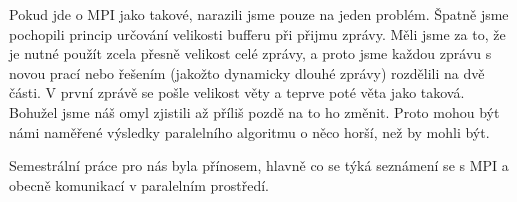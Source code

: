 \documentclass[12pt]{article}
\begin{document}
Pokud jde o MPI jako takové, narazili jsme pouze na jeden problém. Špatně jsme
pochopili princip určování velikosti bufferu při přijmu zprávy. Měli jsme za to,
že je nutné použít zcela přesně velikost celé zprávy, a proto jsme každou zprávu
s novou prací nebo řešením (jakožto dynamicky dlouhé zprávy) rozdělili na dvě
části. V první zprávě se pošle velikost věty a teprve poté věta jako taková.
Bohužel jsme náš omyl zjistili až příliš pozdě na to ho změnit. Proto mohou být námi
naměřené výsledky paralelního algoritmu o něco horší, než by mohli být.

Semestrální práce pro nás byla přínosem, hlavně co se týká seznámení se s MPI a
obecně komunikací v paralelním prostředí. 
\end{document}
